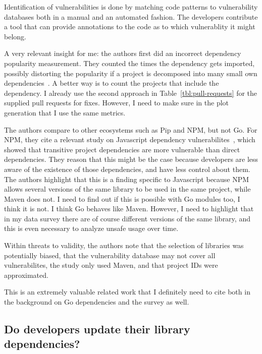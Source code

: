 Identification of vulnerabilities is done by matching code patterns to vulnerability databases both in a manual and an
automated fashion.
The developers contribute a tool that can provide annotations to the code as to which vulnerablity it might belong.

A very relevant insight for me: the authors first did an incorrect dependency popularity measurement.
They counted the times the dependency gets imported, possibly distorting the popularity if a project is decomposed into
many small own dependencies~\cite{sajnani2014}.
A better way is to count the projects that include the dependency.
I already use the second approach in Table~\ref{tbl:pull-requests} for the supplied pull requests for fixes.
However, I need to make sure in the plot generation that I use the same metrics.

The authors compare to other ecosystems such as Pip and NPM, but not Go.
For NPM, they cite a relevant study on Javascript dependency vulnerabilites~\cite{lauinger2017}, which showed that
transitive project dependencies are more vulnerable than direct dependencies.
They reason that this might be the case because developers are less aware of the existence of those dependencies, and
have less control about them.
The authors highlight that this is a finding specific to Javascript because NPM allows several versions of the same
library to be used in the same project, while Maven does not.
I need to find out if this is possible with Go modules too, I think it is not.
I think Go behaves like Maven.
However, I need to highlight that in my data survey there are of course different versions of the same library, and this
is even necessary to analyze unsafe usage over time.

Within threats to validity, the authors note that the selection of libraries was potentially biased, that the
vulnerability database may not cover all vulnerabilites, the study only used Maven, and that project IDs were approximated.

This is an extremely valuable related work that I definitely need to cite both in the background on Go dependencies
and the survey as well.



\subsection{Do developers update their library dependencies?}
\label{subsec:do-developers-update-their-library-dependencies?}

